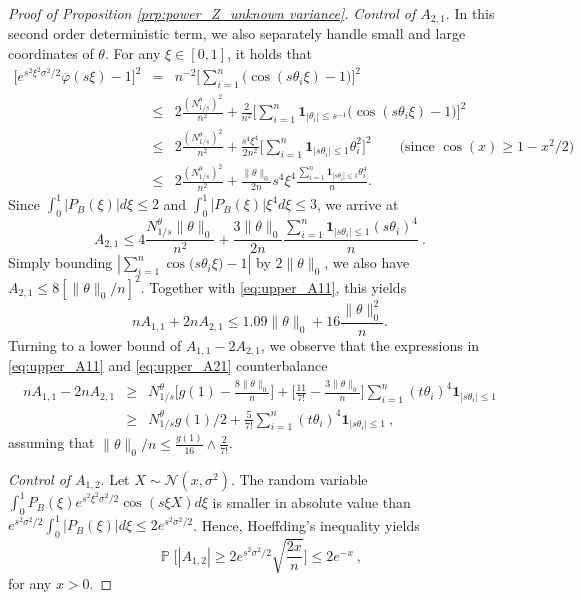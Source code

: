 \documentclass[twoside,11pt]{article}
\def\beq{\begin{equation}}
\def\eeq{\end{equation}}
\def\beqn{\begin{eqnarray*}}
\def\eeqn{\end{eqnarray*}}
\def\cN{\mathcal{N}}
\renewcommand{\P}{\operatorname{\mathbb{P}}}
\newcommand{\<}{\langle}
\renewcommand{\>}{\rangle}
\begin{document}
\begin{proof}[Proof of Proposition \ref{prp:power_Z_unknown variance}]
\noindent 
{\it  Control of $A_{2,1}$}. In this second order deterministic term, we also separately handle small and large coordinates of $\theta$. For any $\xi \in [0,1]$, it holds that
\beqn 
\big[e^{s^2\xi^2\sigma^2/2}\overline{\varphi}(s\xi)- 1\big]^2&=& n^{-2}\Big[\sum_{i=1}^n \big(\cos(s\theta_i\xi) -1\big) \Big]^2\\
&\leq& 2 \frac{(N_{1/s}^{\theta})^2}{n^2}+\frac{2}{n^2}\Big[\sum_{i=1}^n \mathbf{1}_{|\theta_i|\leq s^{-1}}\big(\cos(s\theta_i\xi)-1 \big)\Big]^2\\
&\leq & 2 \frac{(N_{1/s}^{\theta})^2}{n^2}+\frac{s^4\xi^4}{2n^2}\big[\sum_{i=1}^n \mathbf{1}_{|s\theta_i|\leq 1} \theta_i^2  \big]^2\quad\quad \text{(since $\cos(x)\geq 1-x^2/2$)}\\
&\leq & 2 \frac{(N_{1/s}^{\theta})^2}{n^2}+\frac{\|\theta\|_0}{2n} s^4\xi^4\frac{\sum_{i=1}^n \mathbf{1}_{|s\theta_i|\leq 1}  \theta_i^4}{n}.
\eeqn 
Since $\int_{0}^{1} |P_B(\xi)|d\xi\leq 2$ and $\int_{0}^{1} |P_B(\xi)|\xi^4d\xi\leq 3$, we arrive at
\beq\label{eq:upper_A21}
A_{2,1}\leq 4\frac{N_{1/s}^{\theta}\|\theta\|_0}{n^2} + \frac{3\|\theta\|_0}{2n} \frac{\sum_{i=1}^n \mathbf{1}_{|s\theta_i|\leq 1}  (s\theta_i)^4}{n}\ .
\eeq
Simply bounding $|\sum_{i=1}^n \cos\big(s\theta_i\xi\big) -1 |$ by $2\|\theta\|_0$, we also have $A_{2,1}\leq 8 [\|\theta\|_0/n]^2$.
Together with  \eqref{eq:upper_A11}, this yields
\beq \label{eq:upper_A_deterministic_bulk}
nA_{1,1}+ 2nA_{2,1}\leq 1.09 \|\theta\|_0+ 16\frac{\|\theta\|^2_0}{n}. 
\eeq
Turning to a lower bound of $A_{1,1}-2A_{2,1}$, we observe that the expressions in \eqref{eq:upper_A11} and \eqref{eq:upper_A21} counterbalance
\begin{eqnarray}
 nA_{1,1}- 2nA_{2,1}&\geq& N_{1/s}^{\theta} \big[g(1) - \frac{8\|\theta\|_0}{n}\big]  + \big[\frac{11}{7!}- \frac{3\|\theta\|_0}{n}\big]\sum_{i=1}^n (t\theta_i)^4 \mathbf{1}_{|s\theta_i|\leq 1} \nonumber \\
 \label{eq:lower_A_deterministic_bulk}
 &\geq&  N_{1/s}^{\theta}g(1)/2 +  \frac{5}{7!}\sum_{i=1}^n (t\theta_i)^4 \mathbf{1}_{|s\theta_i|\leq 1} \ , 
\end{eqnarray}
assuming that $\|\theta\|_0/n \leq \tfrac{g(1)}{16} \wedge \tfrac{2}{7!}$.

\bigskip 

\noindent 
{\it Control of $A_{1,2}$}. Let $X\sim \cN(x,\sigma^2)$. The random variable 
 $\int_{0}^{1} P_B(\xi)e^{s^2\xi^2\sigma^2/2}\cos(s\xi X)d\xi$ is smaller in absolute value than $e^{s^2 \sigma^2/2}\int_{0}^1|P_B(\xi)|d\xi\leq 2e^{s^2 \sigma^2/2}$. Hence, Hoeffding's inequality yields 
 \[
  \P\Big[|A_{1,2}|\geq  2e^{s^2 \sigma^2/2} \sqrt{\frac{2x}{n}} \Big]\leq 2e^{-x}\ ,
 \]
for any $x>0$.




\end{proof}
\end{document}
